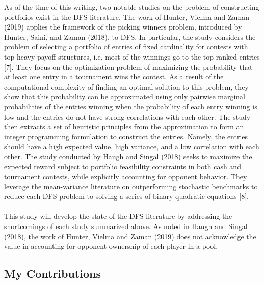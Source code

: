 \documentclass{article}
\begin{document}
As of the time of this writing, two notable studies on the problem of constructing portfolios exist in the DFS literature. The work of Hunter, Vielma and Zaman (2019) applies the framework of the picking winners problem, introduced by Hunter, Saini, and Zaman (2018), to DFS. In particular, the study considers the problem of selecting a portfolio of entries of fixed cardinality for contests with top-heavy payoff structures, i.e. most of the winnings go to the top-ranked entries [7]. They focus on the optimization problem of maximizing the probability that at least one entry in a tournament wins the contest. As a result of the computational complexity of finding an optimal solution to this problem, they show that this probability can be approximated using only pairwise marginal probabilities of the entries winning when the probability of each entry winning is low and the entries do not have strong correlations with each other. The study then extracts a set of heuristic principles from the approximation to form an integer programming formulation to construct the entries. Namely, the entries should have a high expected value, high variance, and a low correlation with each other. The study conducted by Haugh and Singal (2018) seeks to maximize the expected reward subject to portfolio feasibility constraints in both cash and tournament contests, while explicitly accounting for opponent behavior. They leverage the mean-variance literature on outperforming stochastic benchmarks to reduce each DFS problem to solving a series of binary quadratic equations [8].\\
\\
This study will develop the state of the DFS literature by addressing the shortcomings of each study summarized above. As noted in Haugh and Singal (2018), the work of Hunter, Vielma and Zaman (2019) does not acknowledge the value in accounting for opponent ownership of each player in a pool. 

\subsection{My Contributions}
\end{document}
